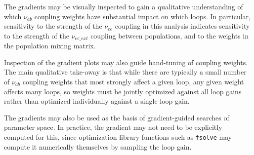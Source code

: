 The gradients may be visually inspected to gain a qualitative understanding
of which $\nu_{ab}$ coupling weights have substantial impact on which loops.
In particular, sensitivity to the strength of the $\nu_{ee}$ coupling in this
analysis indicates sensitivity to the strength of the $\nu_{ee\_ext}$
coupling between populations, and to the weights in the population mixing
matrix.

Inspection of the gradient plots may also guide hand-tuning of coupling
weights. The main qualitative take-away is that while there are typically
a small number of $\nu_{ab}$ coupling weights that most strongly affect a
given loop, any given weight affects many loops, so weights must be jointly
optimized against all loop gains rather than optimized individually against
a single loop gain.

The gradients may also be used as the basis of gradient-guided searches of
parameter space. In practice, the gradient may not need to be explicitly
computed for this, since optimization library functions such as
\texttt{fsolve} may compute it numerically themselves by sampling the
loop gain.



%
%
